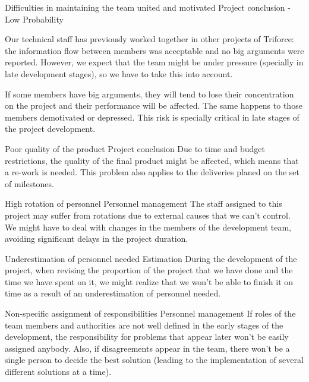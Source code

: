 \begin{risk}{Difficulties in maintaining the team united and motivated}
\riskcat Project conclusion
 - Low Probability 

Our technical staff has previously worked together in other projects of Triforce: the information flow between members was acceptable and no big arguments were reported. However, we expect that the team might be under pressure (specially in late development stages), so we have to take this into account.

If some members have big arguments, they will tend to lose their concentration on the project and their performance will be affected. The same happens to those members demotivated or depressed. This risk is specially critical in late stages of the project development.
\end{risk}

\begin{risk}{Poor quality of the product}
\riskcat Project conclusion
\riskdesc Due to time and budget restrictions, the quality of the final product might be affected, which means that a re-work is needed. This problem also applies to the deliveries planed on the set of milestones.
\end{risk}

\begin{risk}{High rotation of personnel}
\riskcat Personnel management
\riskdesc The staff assigned to this project may suffer from rotations due to external causes that we can't control. We might have to deal with changes in the members of the development team, avoiding significant delays in the project duration.
\end{risk}

\begin{risk}{Underestimation of personnel needed}
\riskcat Estimation
\riskdesc During the development of the project, when revising the proportion of the project that we have done and the time we have spent on it, we might realize that we won't be able to finish it on time as a result of an underestimation of personnel needed. 
\end{risk}

\begin{risk}{Non-specific assignment of responsibilities}
\riskcat Personnel management
\riskdesc If roles of the team members and authorities are not well defined in the early stages of the development, the responsibility for problems that appear later won't be easily assigned anybody. Also, if disagreements appear in the team, there won't be a single person to decide the best solution (leading to the implementation of several different solutions at a time).
\end{risk}

